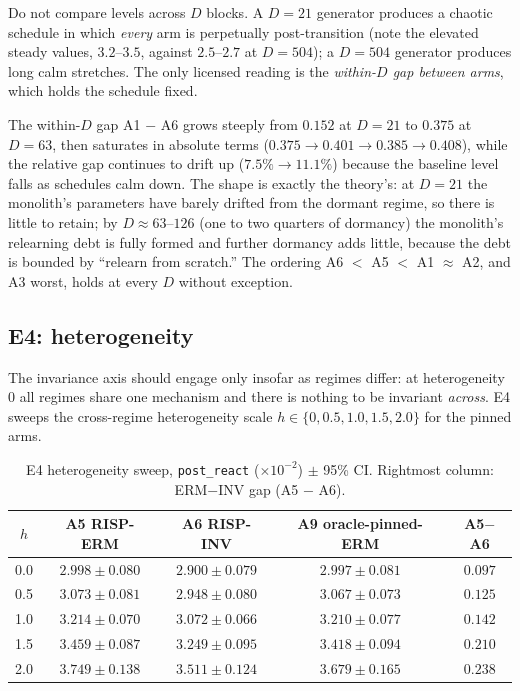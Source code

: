 \begin{warning}
Do not compare levels across $D$ blocks. A $D = 21$ generator produces a
chaotic schedule in which \emph{every} arm is perpetually post-transition
(note the elevated steady values, $3.2$--$3.5$, against $2.5$--$2.7$ at
$D = 504$); a $D = 504$ generator produces long calm stretches. The only
licensed reading is the \emph{within-$D$ gap between arms}, which holds the
schedule fixed.
\end{warning}

The within-$D$ gap A1 $-$ A6 grows steeply from $0.152$ at $D = 21$ to
$0.375$ at $D = 63$, then saturates in absolute terms
($0.375 \to 0.401 \to 0.385 \to 0.408$), while the relative gap continues
to drift up ($7.5\% \to 11.1\%$) because the baseline level falls as
schedules calm down. The shape is exactly the theory's: at $D = 21$ the
monolith's parameters have barely drifted from the dormant regime, so there
is little to retain; by $D \approx 63$--$126$ (one to two quarters of
dormancy) the monolith's relearning debt is fully formed and further
dormancy adds little, because the debt is bounded by ``relearn from
scratch.'' The ordering A6 $<$ A5 $<$ A1 $\approx$ A2, and A3 worst, holds
at every $D$ without exception.

\subsection{E4: heterogeneity}
\label{sec:dd5-e4}

The invariance axis should engage only insofar as regimes differ: at
heterogeneity $0$ all regimes share one mechanism and there is nothing to be
invariant \emph{across}. E4 sweeps the cross-regime heterogeneity scale
$h \in \{0, 0.5, 1.0, 1.5, 2.0\}$ for the pinned arms.

\begin{table}[h]
\centering
\caption{E4 heterogeneity sweep, \texttt{post\_react} ($\times 10^{-2}$)
$\pm$ 95\% CI. Rightmost column: ERM$-$INV gap (A5 $-$ A6).}
\label{tab:dd5-e4}
\small
\begin{tabular}{ccccc}
\toprule
$h$ & A5 RISP-ERM & A6 RISP-INV & A9 oracle-pinned-ERM & A5$-$A6 \\
\midrule
0.0 & $2.998 \pm 0.080$ & $2.900 \pm 0.079$ & $2.997 \pm 0.081$ & $0.097$ \\
0.5 & $3.073 \pm 0.081$ & $2.948 \pm 0.080$ & $3.067 \pm 0.073$ & $0.125$ \\
1.0 & $3.214 \pm 0.070$ & $3.072 \pm 0.066$ & $3.210 \pm 0.077$ & $0.142$ \\
1.5 & $3.459 \pm 0.087$ & $3.249 \pm 0.095$ & $3.418 \pm 0.094$ & $0.210$ \\
2.0 & $3.749 \pm 0.138$ & $3.511 \pm 0.124$ & $3.679 \pm 0.165$ & $0.238$ \\
\bottomrule
\end{tabular}
\end{table}

